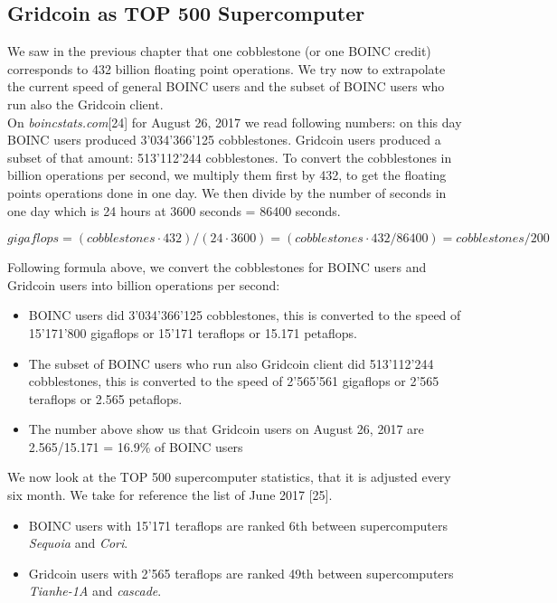 \subsection{Gridcoin as TOP 500 Supercomputer}

We saw in the previous chapter that one cobblestone (or one BOINC credit) corresponds to 432 billion floating point operations. We try now to extrapolate the current speed of general BOINC users and the subset of BOINC users who run also the Gridcoin client.\\

On \textit{boincstats.com}[24] for August 26, 2017 we read following numbers: on this day BOINC users produced 3'034'366'125 cobblestones. Gridcoin users produced a subset of that amount: 513'112'244 cobblestones. To convert the cobblestones in billion operations per second, we multiply them first by 432, to get the floating points operations done in one day. We then divide by the number of seconds in one day which is 24 hours at 3600 seconds = 86400 seconds.

\[ gigaflops = (cobblestones \cdot 432)/(24 \cdot 3600) = (cobblestones \cdot 432/86400) = cobblestones/200 \]

Following formula above, we convert the cobblestones for BOINC users and Gridcoin users into billion operations per second:

\begin{itemize}
	\item BOINC users did 3'034'366'125 cobblestones, this is converted to the speed of 15'171'800 gigaflops or 15'171 teraflops or 15.171 petaflops.
	\item The subset of BOINC users who run also Gridcoin client did 513'112'244 cobblestones, this is converted to the speed of 2'565'561 gigaflops or 2'565 teraflops or 2.565 petaflops.
	\item The number above show us that Gridcoin users on August 26, 2017 are 2.565/15.171 = 16.9\% of BOINC users
\end{itemize}

We now look at the TOP 500 supercomputer statistics, that it is adjusted every six month. We take for reference the list of June 2017 [25].

\begin{itemize}
    \item BOINC users with 15'171 teraflops are ranked 6th between supercomputers \textit{Sequoia} and \textit{Cori}.
	\item Gridcoin users with 2'565 teraflops are ranked 49th between supercomputers \textit{Tianhe-1A} and \textit{cascade}.
\end{itemize}

